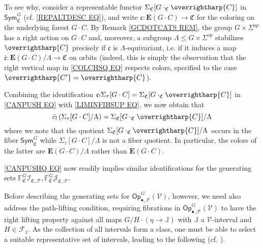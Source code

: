 \documentclass[a4paper,10pt
,draft
]{article}%
\numberwithin{equation}{section}
\numberwithin{figure}{section}
\theoremstyle{definition} %
\newcommand{\vect}[1]{\text{\overrightharp{\ensuremath{#1}}}}
\newcommand{\F}{\ensuremath{\mathcal F}}
\newcommand{\V}{\ensuremath{\mathcal V}}
\newcommand{\1}{\ensuremath{\mathbbm 1}}%
\begin{document}
To see why, 
consider a representable functor
$\Sigma_{\mathfrak{C}}[G \cdot_{\mathfrak{C}} \vect{C}]$
in
$\mathsf{Sym}^G_{\mathfrak{C}}$
(cf. \eqref{REPALTDESC EQ}),
and write
$\mathfrak{c} \colon 
\boldsymbol{E}(G \cdot C) \to \mathfrak{C}$
for the coloring on the underlying forest $G \cdot C$.
By Remark \ref{GCDOTCATS REM},
the group $G \times \Sigma^{op}$
has a right action on $G \cdot C$ and, 
moreover, a subgroup
$\Lambda \leq G \times \Sigma^{op}$ stabilizes $\vect{C}$
precisely if $\mathfrak{c}$ is $\Lambda$-equivariant,
i.e. if it induces a map 
$\bar{\mathfrak{c}} \colon 
\boldsymbol{E}(G \cdot C)/\Lambda \to \mathfrak{C}$
on orbits
(indeed, this is simply the observation that the right vertical map in 
\eqref{COLCHSQ EQ} respects colors, specified to the case
$\vect{C'} = \vect{C}$).


Combining the identification
$\mathfrak{c}_! \Sigma_{\tau}[G \cdot C]
=
\Sigma_{\mathfrak{C}}[G \cdot_{\mathfrak{C}} \vect{C}]$
in 
\eqref{CANPUSH EQ}
with 
\eqref{LIMINFIBSUP EQ},
we now obtain that
\begin{equation}\label{CANPUSHQ EQ}
\bar{c}_{!} 
\left(
\Sigma_{\tau}[G \cdot C]/\Lambda
\right)
=
\Sigma_{\mathfrak{C}}[G \cdot_{\mathfrak{C}} \vect{C}]/\Lambda
\end{equation}
where we note that the quotient
$\Sigma_{\mathfrak{C}}[G \cdot_{\mathfrak{C}} \vect{C}]/\Lambda$
occurs in the fiber $\mathsf{Sym}^G_{\mathfrak{C}}$
while $\Sigma_{\tau}[G \cdot C]/\Lambda$
is not a fiber quotient.
In particular, the colors of the latter are
$\boldsymbol{E}(G \cdot C)/\Lambda$
rather than $\boldsymbol{E}(G \cdot C)$.

\eqref{CANPUSHQ EQ} now readily implies similar identifications for the generating sets
$\mathbb{F}^G_{\mathfrak{C}} \mathcal{I}_{\mathfrak{C},\mathcal{F}},
\mathbb{F}^G_{\mathfrak{C}} \mathcal{J}_{\mathfrak{C},\mathcal{F}}$.




Before describing the generating sets for 
$\mathsf{Op}^G_{\bullet,\mathcal{F}}(\V)$, however,
we need also address the path-lifting condition, 
requiring fibrations in $\mathsf{Op}^G_{\bullet,\F}(\V)$ to have the right lifting property against all maps 
$G/H \cdot (\eta \to \mathbb J)$
with $\mathbb{J}$ a $\V$-interval and $H \in \F_1$.
As the collection of all intervals form a class, one must be able to select a suitable representative set of intervals, leading to the following (cf. \cite{BM13}).
\end{document}

